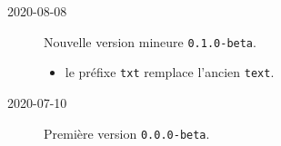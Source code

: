 \documentclass[12pt,a4paper]{article}
\begin{document}
\begin{description}
    
    \separation


    \medskip
    \item[2020-08-08] Nouvelle version mineure \verb+0.1.0-beta+.
    
    \begin{itemize}[itemsep=.5em]
        \item {}
              le préfixe \verb#txt# remplace l'ancien \verb#text#.
    \end{itemize}
    
    
    \separation

    \medskip
    \item[2020-07-10] Première version \verb+0.0.0-beta+.

\end{description}
\end{document}

